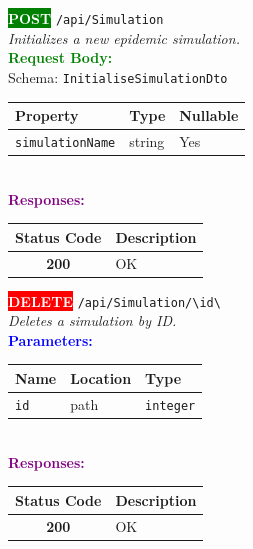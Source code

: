 \begin{tcolorbox}[
    colback=green!5,
    colframe=green,
    arc=2mm,
    boxrule=1pt,
    left=5pt,
    right=5pt,
    top=5pt,
    bottom=5pt
]
\noindent\colorbox{green}{\textcolor{white}{\textbf{POST}}} 
\texttt{\large /api/Simulation}\\[0.3em]
\textit{Initializes a new epidemic simulation.}\\[0.3em]
\vspace{0.3em}
\textbf{\textcolor{green}{Request Body:}}\\[0.2em]
Schema: \texttt{InitialiseSimulationDto}\\[0.3em]
\begin{tabular}{|l|l|l|}
\hline
\rowcolor{green!10}
\textbf{Property} & \textbf{Type} & \textbf{Nullable} \\ \hline
\texttt{simulationName} & string & Yes \\ \hline
\end{tabular}\\[0.5em]
\vspace{0.3em}
\textbf{\textcolor{purple}{Responses:}}\\[0.2em]
\begin{tabular}{|c|p{10cm}|}
\hline
\rowcolor{gray!20}
\textbf{Status Code} & \textbf{Description} \\ \hline
\colorbox{green!20}{\textbf{200}} & OK \\ \hline
\end{tabular}
\end{tcolorbox}
\vspace{0.5em}

\begin{tcolorbox}[
    colback=red!5,
    colframe=red,
    arc=2mm,
    boxrule=1pt,
    left=5pt,
    right=5pt,
    top=5pt,
    bottom=5pt
]
\noindent\colorbox{red}{\textcolor{white}{\textbf{DELETE}}} 
\texttt{\large /api/Simulation/\textbackslash{}{id\textbackslash{}}}\\[0.3em]
\textit{Deletes a simulation by ID.}\\[0.3em]
\vspace{0.3em}
\textbf{\textcolor{blue}{Parameters:}}\\[0.2em]
\begin{tabular}{|l|l|l|}
\hline
\rowcolor{gray!20}
\textbf{Name} & \textbf{Location} & \textbf{Type} \\ \hline
\texttt{id} & path & \texttt{integer} \\ \hline
\end{tabular}\\[0.5em]
\vspace{0.3em}
\textbf{\textcolor{purple}{Responses:}}\\[0.2em]
\begin{tabular}{|c|p{10cm}|}
\hline
\rowcolor{gray!20}
\textbf{Status Code} & \textbf{Description} \\ \hline
\colorbox{green!20}{\textbf{200}} & OK \\ \hline
\end{tabular}
\end{tcolorbox}
\vspace{0.5em}

